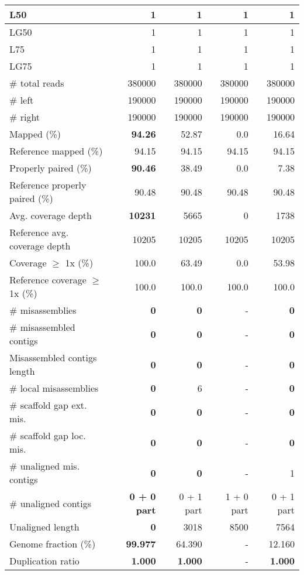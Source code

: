 \documentclass[12pt,a4paper]{article}
\begin{document}
\begin{table}[ht]
\begin{center}
\begin{tabular}{|l*{4}{|r}|}
L50 & 1 & 1 & 1 & 1 \\ \hline
LG50 & 1 & 1 & 1 & 1 \\ \hline
L75 & 1 & 1 & 1 & 1 \\ \hline
LG75 & 1 & 1 & 1 & 1 \\ \hline
\# total reads & 380000 & 380000 & 380000 & 380000 \\ \hline
\# left & 190000 & 190000 & 190000 & 190000 \\ \hline
\# right & 190000 & 190000 & 190000 & 190000 \\ \hline
Mapped (\%) & {\bf 94.26} & 52.87 & 0.0 & 16.64 \\ \hline
Reference mapped (\%) & 94.15 & 94.15 & 94.15 & 94.15 \\ \hline
Properly paired (\%) & {\bf 90.46} & 38.49 & 0.0 & 7.38 \\ \hline
Reference properly paired (\%) & 90.48 & 90.48 & 90.48 & 90.48 \\ \hline
Avg. coverage depth & {\bf 10231} & 5665 & 0 & 1738 \\ \hline
Reference avg. coverage depth & 10205 & 10205 & 10205 & 10205 \\ \hline
Coverage $\geq$ 1x (\%) & 100.0 & 63.49 & 0.0 & 53.98 \\ \hline
Reference coverage $\geq$ 1x (\%) & 100.0 & 100.0 & 100.0 & 100.0 \\ \hline
\# misassemblies & {\bf 0} & {\bf 0} & - & {\bf 0} \\ \hline
\# misassembled contigs & {\bf 0} & {\bf 0} & - & {\bf 0} \\ \hline
Misassembled contigs length & {\bf 0} & {\bf 0} & - & {\bf 0} \\ \hline
\# local misassemblies & {\bf 0} & 6 & - & {\bf 0} \\ \hline
\# scaffold gap ext. mis. & {\bf 0} & {\bf 0} & - & {\bf 0} \\ \hline
\# scaffold gap loc. mis. & {\bf 0} & {\bf 0} & - & {\bf 0} \\ \hline
\# unaligned mis. contigs & {\bf 0} & {\bf 0} & - & 1 \\ \hline
\# unaligned contigs & {\bf 0 + 0 part} & 0 + 1 part & 1 + 0 part & 0 + 1 part \\ \hline
Unaligned length & {\bf 0} & 3018 & 8500 & 7564 \\ \hline
Genome fraction (\%) & {\bf 99.977} & 64.390 & - & 12.160 \\ \hline
Duplication ratio & {\bf 1.000} & {\bf 1.000} & - & {\bf 1.000} \\ \hline

\end{tabular}
\end{center}
\end{table}
\end{document}
